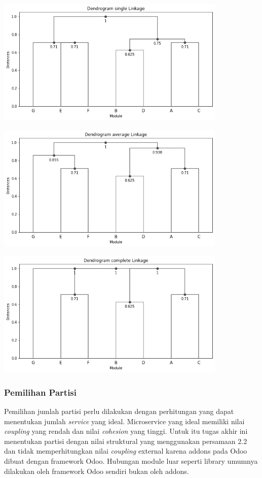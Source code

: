 \begin{center}
	\includegraphics[width=11cm]{img/bab_3/singleLink.png}
	\label{fig:asd}
\end{center}
\begin{center}
	\includegraphics[width=11cm]{img/bab_3/averageLink.png}
	\label{fig:asd}
\end{center}
\begin{center}
	\includegraphics[width=11cm]{img/bab_3/completeLink.png}
	\label{fig:asd}
\end{center}

\subsubsection{Pemilihan Partisi}
Pemilihan jumlah partisi perlu dilakukan dengan perhitungan yang dapat menentukan jumlah \textit{service} yang ideal. Microservice yang ideal memiliki nilai \textit{coupling} yang rendah dan nilai \textit{cohesion} yang tinggi. Untuk itu tugas akhir ini menentukan partisi dengan nilai struktural yang menggunakan persamaan 2.2 dan tidak memperhitungkan nilai \textit{coupling} external karena addons pada Odoo dibuat dengan framework Odoo. Hubungan module luar seperti library umumnya dilakukan oleh framework Odoo sendiri bukan oleh addons.

